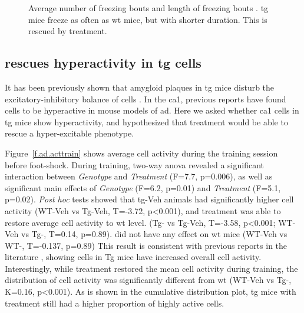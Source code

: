 \begin{figure}[h]
    \begin{subfigure}[h]{\textwidth}
        
        \caption{\label{f.ad.freezing_freq}}
    \end{subfigure}
    \begin{subfigure}[h]{\textwidth}
        
        \caption{\label{f.ad.freezing_bouts}}
    \end{subfigure}
    \caption[Freezing lengths and number of freezing bouts.]{Average number of freezing bouts  and length of freezing bouts . \Gls{tg} mice freeze as often as \gls{wt} mice, but with shorter duration. This is rescued by \tglu{} treatment. \label{f.ad.freezing_profile}}
\end{figure}


\subsection{\tglu{} rescues hyperactivity in \gls{tg} cells}

It has been previously shown that amygloid plaques in \gls{tg} mice disturb the excitatory-inhibitory balance of cells \citep{palop16}. In the \gls{ca1}, previous reports have found cells to be hyperactive in mouse models of \gls{ad}. Here we asked whether \gls{ca1} cells in \gls{tg} mice show hyperactivity, and hypothesized that \tglu{} treatment would be able to rescue a hyper-excitable phenotype.

Figure~\ref{f.ad.acttrain} shows average cell activity during the training session before foot-shock. During training, two-way \gls{anova} revealed a significant interaction between \textit{Genotype} and \textit{Treatment} (F=7.7, p=0.006), as well as significant main effects of \textit{Genotype} (F=6.2, p=0.01) and \textit{Treatment} (F=5.1, p=0.02). \textit{Post hoc} tests showed that \gls{tg}-Veh animals had significantly higher cell activity (WT-Veh vs Tg-Veh, T=-3.72, p<0.001), and \tglu{} treatment was able to restore average cell activity to \gls{wt} level. (Tg-\glu{} vs Tg-Veh, T=-3.58, p<0.001; WT-Veh vs Tg-\glu, T=0.14, p=0.89). \tglu{} did not have any effect on \gls{wt} mice (WT-Veh vs WT-\glu, T=-0.137, p=0.89) This result is consistent with previous reports in the literature \citep{verret12}, showing cells in Tg mice have increased overall cell activity. Interestingly, while \tglu{} treatment restored the mean cell activity during training, the distribution of cell activity was significantly different from \gls{wt} (WT-Veh vs Tg-\glu, K=0.16, p<0.001). As is shown in the cumulative distribution plot, \gls{tg} mice with \tglu{} treatment still had a higher proportion of highly active cells. 

